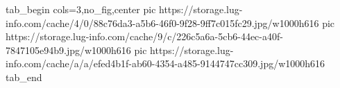  
 
 
 
 

\ifcmt
  tab_begin cols=3,no_fig,center
     pic https://storage.lug-info.com/cache/4/0/88c76da3-a5b6-46f0-9f28-9ff7c015fc29.jpg/w1000h616%
		 pic https://storage.lug-info.com/cache/9/c/226c5a6a-5cb6-44ec-a40f-7847105e94b9.jpg/w1000h616%
		 pic https://storage.lug-info.com/cache/a/a/efed4b1f-ab60-4354-a485-9144747cc309.jpg/w1000h616%
  tab_end
\fi
